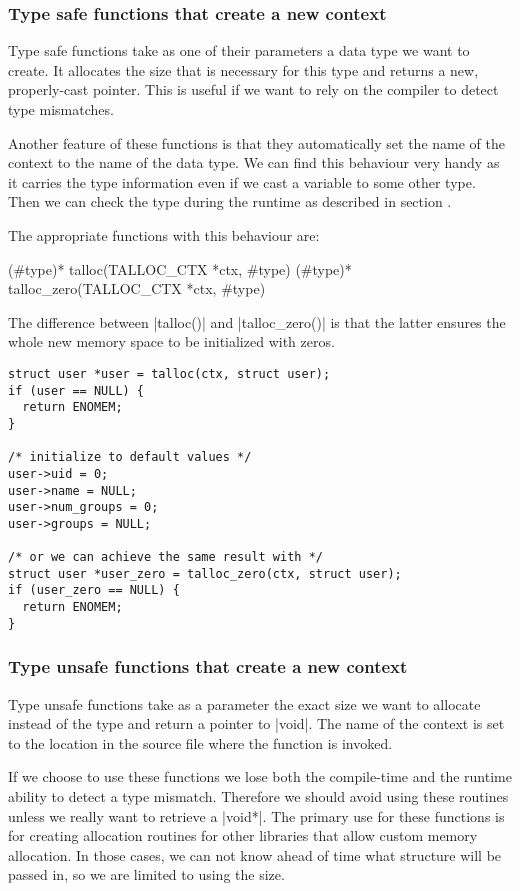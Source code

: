 \subsubsection{Type safe functions that create a new context}

Type safe functions take as one of their parameters a data type we want to
create. It allocates the size that is necessary for this type and returns a
new, properly-cast pointer. This is useful if we want to rely on the compiler
to detect type mismatches.

Another feature of these functions is that they automatically set the name of
the context to the name of the data type. We can find this behaviour very handy
as it carries the type information even if we cast a variable to some other
type. Then we can check the type during the runtime as described in section
.

The appropriate functions with this behaviour are:

\begin{funcproto}
(#type)* talloc(TALLOC_CTX *ctx, #type)
(#type)* talloc_zero(TALLOC_CTX *ctx, #type)
\end{funcproto}
\funclistend
The difference between |talloc()| and |talloc_zero()| is that the latter ensures
the whole new memory space to be initialized with zeros.

\begin{lstlisting}[caption={talloc() and talloc_zero()},label=lst:talloc_zero]
struct user *user = talloc(ctx, struct user);
if (user == NULL) {
  return ENOMEM;
}

/* initialize to default values */
user->uid = 0;
user->name = NULL;
user->num_groups = 0;
user->groups = NULL;

/* or we can achieve the same result with */
struct user *user_zero = talloc_zero(ctx, struct user);
if (user_zero == NULL) {
  return ENOMEM;
}
\end{lstlisting}

\subsubsection{Type unsafe functions that create a new context}

Type unsafe functions take as a parameter the exact size we want to allocate
instead of the type and return a pointer to |void|. The name of the context
is set to the location in the source file where the function is invoked.

If we choose to use these functions we lose both the compile-time and the
runtime ability to detect a type mismatch. Therefore we should avoid using these
routines unless we really want to retrieve a |void*|. The primary use for
these functions is for creating allocation routines for other libraries that
allow custom memory allocation. In those cases, we can not know ahead of time
what structure will be passed in, so we are limited to using the size.

